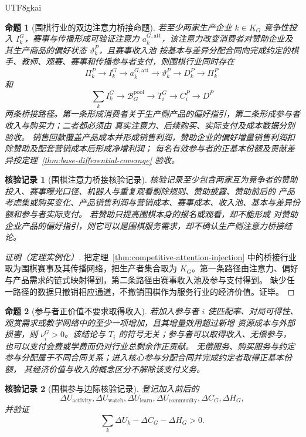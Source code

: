 \documentclass[12pt,a4paper,openany]{report}
\newtheorem{proposition}{命题}[chapter]
\newtheorem{Certificate}{核验记录}[chapter]
\begin{document}
\begin{CJK*}{UTF8}{gkai}
\begin{proposition}[围棋行业的双边注意力桥接命题]
\label{prop:go-attention-bridge}
若至少两家生产企业 \(k\in K_G\) 竞争性投入 \(I_k^G\)，赛事与传播形成可验证注意力
\(a_k^{G,\mathrm{att}}\)，该注意力改变消费者对赞助企业及其生产商品的偏好状态 \(\vartheta_k^P\)，且赛事收入池
按基本与差异分配合同向完成约定的棋手、教师、观赛、赛事和传播参与者支付，则围棋行业同时存在
\[
  \Pi_k^P\to I_k^G\to a_k^{G,\mathrm{att}}\to\vartheta_k^P
  \to D_k^P\to\Pi_k^{P\prime}
\]
和
\[
  \sum_k I_k^G\to\mathcal B_G^{\mathrm{pool}}\to T_i^G\to C_i^P\to D^P
\]
两条桥接路径。第一条形成消费者关于生产侧产品的偏好指引，第二条形成参与者收入与购买力；二者都必须由
真实注意力、后续购买、实际支付及成本数据分别验收。
销售回款覆盖产品成本并形成销售利润，赞助企业的偏好增量销售利润扣除赞助及配套营销成本后形成净增利润；
每名有效参与者的正基本份额及贡献差异按定理~\ref{thm:base-differential-coverage} 验收。
\end{proposition}

\begin{Certificate}[围棋注意力桥接核验记录]
核验记录至少包含两家互为竞争者的赞助投入、赛事曝光口径、机器人与重复观看剔除规则、赞助披露、赞助前后的
产品考虑集或购买变化、产品销售利润与营销成本、赛事成本、收入池、基本与差异份额和参与者实际支付。
若赞助只提高围棋本身的报名或观看，却不能形成
对赞助企业产品的偏好指引，则它可以是围棋服务需求，却不确认生产侧注意力桥接结论。
\end{Certificate}

\begin{proof}[证明（定理实例化）]
把定理~\ref{thm:competitive-attention-injection} 中的桥接行业取为围棋赛事及其传播网络，把生产者集合取为
\(K_G\)。第一条路径由注意力、偏好与产品需求的链式映射得到，第二条路径由赛事收入池及参与支付得到。
缺少任一路径的数据只撤销相应通道，不撤销围棋作为服务行业的经济价值。证毕。
\end{proof}

\begin{proposition}[参与者正价值不要求取得收入]
\label{prop:go-participation-value}
若加入参与者 \(i\) 使匹配率、对局可得性、观赏需求或教学网络中的至少一项增加，且其增量效用超过新增
资源成本与外部损害，则 \(\nu_i^G>0\)。该结论与 \(T_i\) 的符号无关；参与者可以取得收入、无偿参与，
也可以支付会费或学费而仍对行业总剩余作正贡献。
无偿服务、购买服务与约定参与分配属于不同合同关系；进入核心参与分配合同并完成约定者取得正基本份额，
其经济价值与收入的概念区分不解除该支付义务。
\end{proposition}

\begin{Certificate}[围棋参与边际核验记录]
登记加入前后的
\[
  \Delta U_{\mathrm{activity}},\Delta U_{\mathrm{watch}},
  \Delta U_{\mathrm{learn}},\Delta U_{\mathrm{community}},
  \Delta C_G,\Delta H_G,
\]
并验证
\[
  \sum_k\Delta U_k-\Delta C_G-\Delta H_G>0.
\]
\end{Certificate}


\end{CJK*}
\end{document}
